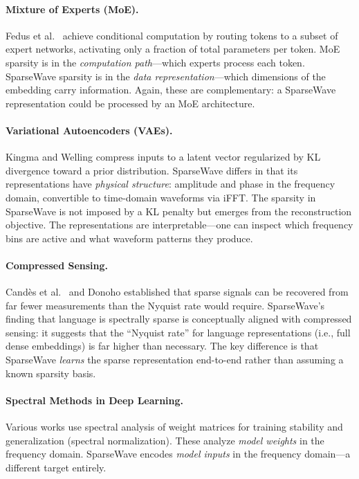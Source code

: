 \documentclass[10pt,twocolumn]{article}
\begin{document}
\paragraph{Mixture of Experts (MoE).} Fedus et al.\ \cite{fedus2022switch} achieve conditional computation by routing tokens to a subset of expert networks, activating only a fraction of total parameters per token. MoE sparsity is in the \emph{computation path}---which experts process each token. SparseWave sparsity is in the \emph{data representation}---which dimensions of the embedding carry information. Again, these are complementary: a SparseWave representation could be processed by an MoE architecture.

\paragraph{Variational Autoencoders (VAEs).} Kingma and Welling \cite{kingma2014auto} compress inputs to a latent vector regularized by KL divergence toward a prior distribution. SparseWave differs in that its representations have \emph{physical structure}: amplitude and phase in the frequency domain, convertible to time-domain waveforms via iFFT. The sparsity in SparseWave is not imposed by a KL penalty but emerges from the reconstruction objective. The representations are interpretable---one can inspect which frequency bins are active and what waveform patterns they produce.

\paragraph{Compressed Sensing.} Cand\`{e}s et al.\ \cite{candes2006robust} and Donoho \cite{donoho2006compressed} established that sparse signals can be recovered from far fewer measurements than the Nyquist rate would require. SparseWave's finding that language is spectrally sparse is conceptually aligned with compressed sensing: it suggests that the ``Nyquist rate'' for language representations (i.e., full dense embeddings) is far higher than necessary. The key difference is that SparseWave \emph{learns} the sparse representation end-to-end rather than assuming a known sparsity basis.

\paragraph{Spectral Methods in Deep Learning.} Various works \cite{miyato2018spectral} use spectral analysis of weight matrices for training stability and generalization (spectral normalization). These analyze \emph{model weights} in the frequency domain. SparseWave encodes \emph{model inputs} in the frequency domain---a different target entirely.
\end{document}
